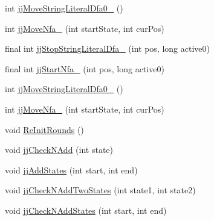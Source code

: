\begin{DoxyCompactItemize}
int \hyperlink{classorg_1_1coode_1_1owlapi_1_1functionalparser_1_1_o_w_l_functional_syntax_parser_token_manager_a775377f59d1b385e47cae8289127bbdc}{jj\-Move\-String\-Literal\-Dfa0\-\_} ()
\item 
int \hyperlink{classorg_1_1coode_1_1owlapi_1_1functionalparser_1_1_o_w_l_functional_syntax_parser_token_manager_a3bc582d3cda5f5b543b40babbb8a0159}{jj\-Move\-Nfa\-\_} (int start\-State, int cur\-Pos)
\item 
final int \hyperlink{classorg_1_1coode_1_1owlapi_1_1functionalparser_1_1_o_w_l_functional_syntax_parser_token_manager_abbc436f8187d311832328b17dbd2977b}{jj\-Stop\-String\-Literal\-Dfa\-\_} (int pos, long active0)
\item 
final int \hyperlink{classorg_1_1coode_1_1owlapi_1_1functionalparser_1_1_o_w_l_functional_syntax_parser_token_manager_a809a709edd0da502e78d6983432339b8}{jj\-Start\-Nfa\-\_} (int pos, long active0)
\item 
int \hyperlink{classorg_1_1coode_1_1owlapi_1_1functionalparser_1_1_o_w_l_functional_syntax_parser_token_manager_a3ead0fd78f400e7e7dcd98454112c2c2}{jj\-Move\-String\-Literal\-Dfa0\-\_} ()
\item 
int \hyperlink{classorg_1_1coode_1_1owlapi_1_1functionalparser_1_1_o_w_l_functional_syntax_parser_token_manager_acf89cfb89080dbd1878a67de5d5794f5}{jj\-Move\-Nfa\-\_} (int start\-State, int cur\-Pos)
\item 
void \hyperlink{classorg_1_1coode_1_1owlapi_1_1functionalparser_1_1_o_w_l_functional_syntax_parser_token_manager_a615114a4671cd811bbafcc907d5cd85e}{Re\-Init\-Rounds} ()
\item 
void \hyperlink{classorg_1_1coode_1_1owlapi_1_1functionalparser_1_1_o_w_l_functional_syntax_parser_token_manager_ac72e5c0e9765fd668cd4d5e0d7fbc40e}{jj\-Check\-N\-Add} (int state)
\item 
void \hyperlink{classorg_1_1coode_1_1owlapi_1_1functionalparser_1_1_o_w_l_functional_syntax_parser_token_manager_ab662d781e49845fb8c0f48000c00964e}{jj\-Add\-States} (int start, int end)
\item 
void \hyperlink{classorg_1_1coode_1_1owlapi_1_1functionalparser_1_1_o_w_l_functional_syntax_parser_token_manager_ac89f0f0a84c07734aa3a1f280ab34980}{jj\-Check\-N\-Add\-Two\-States} (int state1, int state2)
\item 
void \hyperlink{classorg_1_1coode_1_1owlapi_1_1functionalparser_1_1_o_w_l_functional_syntax_parser_token_manager_a70b47ef39f3fba988651bfee49e36b28}{jj\-Check\-N\-Add\-States} (int start, int end)
\end{DoxyCompactItemize}
